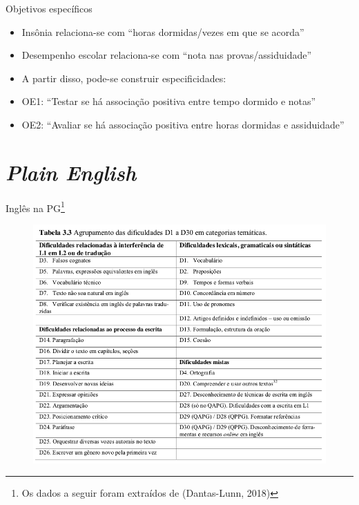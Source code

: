 \begin{frame}{Objetivos específicos}
\begin{itemize}
\item Insônia relaciona-se com ``horas dormidas/vezes em que se acorda''
\item Desempenho escolar relaciona-se com ``nota nas provas/assiduidade''
\item A partir disso, pode-se construir especificidades: 
\item OE1: ``Testar se há associação positiva entre tempo dormido e notas''
\item OE2: ``Avaliar se há associação positiva entre horas dormidas e assiduidade''
\end{itemize}
\end{frame}

\section{\emph{Plain English}}

\begin{frame}{Inglês na PG\footnote{Os dados a seguir foram extraídos de (Dantas-Lunn, 2018)}}
\begin{figure}
\centering
\includegraphics[scale=0.3]{figs/05/dificuldades-apg}
\end{figure}
\end{frame}

